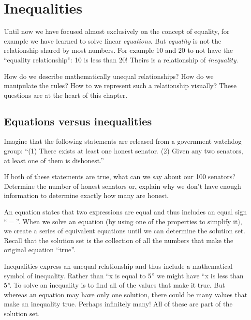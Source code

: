 \chapter{Inequalities}
\label{ch:inequalities}


Until now we have focused almost exclusively on the concept of equality, for example we have learned to solve linear \textit{equations}. But \textit{equality} is not the relationship shared by most numbers. For example 10 and 20 to not have the ``equality relationship'': 10 is less than 20! Theirs is a relationship of \textit{inequality}.

How do we describe mathematically unequal relationships? How do we manipulate the rules? How to we represent such a relationship visually? These questions are at the heart of this chapter.

\section{Equations versus inequalities}
\label{sec:ineqintro}

\begin{boxexplore}
Imagine that the following statements are released from a government watchdog group: ``(1) There exists at least one honest senator. (2) Given any two senators, at least one of them is dishonest.''

If both of these statements are true, what can we say about our 100 senators? Determine the number of honest senators or, explain why we don't have enough information to determine exactly how many are honest.
\end{boxexplore}

An equation states that two expressions are equal and thus includes an equal sign ``$=$''. When we solve an equation (by using one of the properties to simplify it), we create a series of equivalent equations until we can determine the solution set. Recall that the solution set is the collection of all the numbers that make the original equation ``true''.

Inequalities express an unequal relationship and thus include a mathematical symbol of inequality. Rather than ``x is equal to 5'' we might have ``x is less than 5''. To solve an inequality is to find all of the values that make it true. But whereas an equation may have only one solution, there could be many values that make an inequality true. Perhaps infinitely many! All of these are part of the solution set. 

